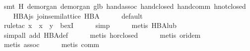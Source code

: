 \begin{isabellebody}
\ {}smt\ H{}\ de{}morgan{}\ de{}morgan{}\ glb{}\ hand{}assoc\ hand{}closed\ hand{}comm\ hnot{}closed{}%
\endisatagproof
{\isafoldproof}%
%
\isadelimproof
\isanewline
%
\endisadelimproof
\isanewline
\ \ \isamarkupfalse%
\ HBA{}js{}\ {}join{}semilattice\ HBA{}\isanewline
%
\isadelimproof
\ \ \ \ %
\endisadelimproof
%
\isatagproof
{}\isamarkupfalse%
\ default\isanewline
\ \ \ \ \isamarkupfalse%
\ {}\isanewline
\ \ \ \ \isamarkupfalse%
\ {}rule{}tac\ x\ {}\ {}x\ {}\ y{}\ \ bexI{}\isanewline
\ \ \ \ \isamarkupfalse%
\ simp\isanewline
\ \ \ \ \isamarkupfalse%
\ {}metis\ HBA{}lub{}\isanewline
\ \ \ \ \isamarkupfalse%
\ {}simp{}all\ add{}\ HBA{}def{}\isanewline
\ \ \ \ \isamarkupfalse%
\ {}metis\ hor{}closed{}\isanewline
\ \ \ \ \isamarkupfalse%
\ {}metis\ or{}idem{}\isanewline
\ \ \ \ \isamarkupfalse%
\ {}metis\ assoc{}\isanewline
\ \ \ \ \isamarkupfalse%
\ {}metis\ comm{}%
\endisatagproof
{\isafoldproof}%
%
\isadelimproof
\isanewline
%
\endisadelimproof
\isanewline
\ \ \isamarkupfalse%

\end{isabellebody}
